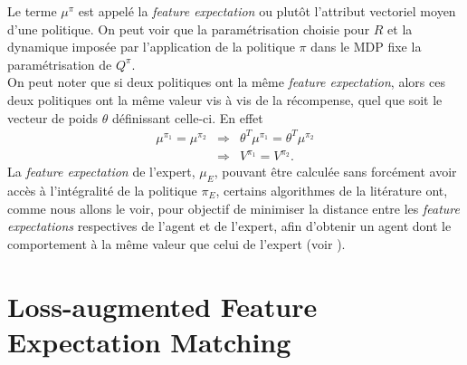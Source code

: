 \documentclass[publibook-draft]{CAp2012}
\begin{document}
Le terme $\mu^\pi$ est appelé la {\it feature expectation} ou plutôt l'attribut vectoriel moyen d'une politique. On peut voir que la paramétrisation choisie pour $R$ et la dynamique imposée par l'application de la politique $\pi$ dans le MDP fixe la paramétrisation de $Q^\pi$.\\

On peut noter que si deux politiques ont la même {\it feature expectation}, alors ces deux politiques ont la même valeur vis à vis de la récompense, quel que soit le vecteur de poids $\theta$ définissant celle-ci. En effet
\begin{eqnarray}
\mu^{\pi_1} = \mu^{\pi_2} &\Rightarrow& \theta^T\mu^{\pi_1} = \theta^T\mu^{\pi_2}\\
& \Rightarrow& V^{\pi_1} = V^{\pi_2}.
\label{memevaleur.eqn}
\end{eqnarray}
La {\it feature expectation} de l'expert, $\mu_E$, pouvant être calculée sans forcément avoir accès à l'intégralité de la politique $\pi_E$, certains algorithmes de la litérature ont, comme nous allons le voir, pour objectif de minimiser la distance entre les {\it feature expectations} respectives de l'agent et de l'expert, afin d'obtenir un agent dont le comportement à la même valeur que celui de l'expert (voir \cite{neu2009training}).
\section{Loss-augmented Feature Expectation Matching}
\end{document}
